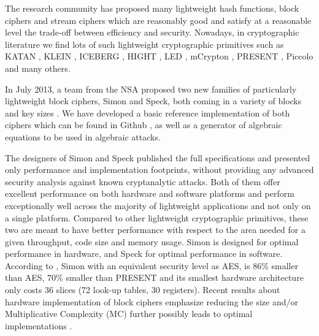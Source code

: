 The research community has
proposed many lightweight hash functions, block ciphers and stream ciphers which are
reasonably good and satisfy at a reasonable level the trade-off
between efficiency and security. Nowadays, in cryptographic
literature we find lots of such lightweight cryptographic primitives such as
KATAN \cite{KATAN}, KLEIN \cite{KLEIN}, ICEBERG
\cite{ICEBERG}, HIGHT \cite{HIGHT}, LED \cite{LED},
mCrypton \cite{mCrypton}, PRESENT \cite{PRESENT}, Piccolo \cite{Piccolo}
and many others.

In July 2013, a team from the NSA proposed two new families of particularly lightweight block
ciphers, Simon and Speck, both coming in a variety of blocks and key sizes
\cite{NSAciphers}. We have developed a basic reference implementation of both ciphers 
which can be found in Github \cite{simonref},
as well as a generator of algebraic equations to be used in algebraic attacks. 

The designers of Simon and Speck published the full specifications and presented
only performance and implementation footprints, without providing
any advanced security analysis
against known cryptanalytic attacks.
Both of them offer excellent performance on both
hardware and software platforms and perform
exceptionally well across the majority of lightweight applications and
not only on a single platform. Compared to
other lightweight cryptographic primitives,
these two are meant to have better performance with respect to the area
needed for a given throughput, code size and memory usage.
Simon is designed for optimal performance in hardware, and Speck for optimal
performance in software.
According to \cite{simoneff}, Simon with an equivalent security level as AES,
is $86\%$ smaller
than AES, $70\%$ smaller than PRESENT and its smallest hardware architecture
only costs 36 slices (72 look-up tables, 30 registers). Recent results about hardware
implementation of block ciphers emphasize reducing the size and/or Multiplicative Complexity (MC) further possibly
leads to optimal implementations \cite{BoyarPeraltaMCMethodAES,OptimiPaper}.

